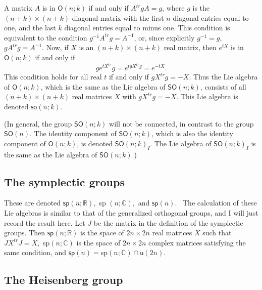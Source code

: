 \documentclass[12pt]{amsbook}
\theoremstyle{plain}
\numberwithin{equation}{chapter}
\numberwithin{theorem}{chapter}
\begin{document}
A matrix $A$ is in $\mathsf{O}(n;k)$ if and only if $A^{tr}gA=g$, where $g$ is
the $(n+k)\times(n+k)$ diagonal matrix with the first $n$ diagonal entries
equal to one, and the last $k$ diagonal entries equal to minus one. This
condition is equivalent to the condition $g^{-1}A^{tr}g=A^{-1}$, or, since
explicitly $g^{-1}=g$, $gA^{tr}g=A^{-1}$. Now, if $X$ is an $(n+k)\times(n+k)$
real matrix, then $e^{tX}$ is in $\mathsf{O}(n;k)$ if and only if
\[
ge^{tX^{tr}}g=e^{tgX^{tr}g}=e^{-tX}\text{.}%
\]
This condition holds for all real $t$ if and only if $gX^{tr}g=-X$. Thus the
Lie algebra of $\mathsf{O}(n;k)$, which is the same as the Lie algebra of
$\mathsf{SO}(n;k)$, consists of all $(n+k)\times(n+k)$ real matrices $X$ with
$gX^{tr}g=-X$. This Lie algebra is denoted $\mathsf{so}(n;k)$.

(In general, the group $\mathsf{SO}(n;k)$ will not be connected, in contrast
to the group $\mathsf{SO}(n)$. The identity component of $\mathsf{SO}(n;k)$,
which is also the identity component of $\mathsf{O}(n;k)$, is denoted
$\mathsf{SO}(n;k)_{I}$. The Lie algebra of $\mathsf{SO}(n;k)_{I}$ is the same
as the Lie algebra of $\mathsf{SO}(n;k)$.)

\subsection{The symplectic groups}

These are denoted $\mathsf{sp}\left(  n;\mathbb{R}\right)  ,$ \textsf{sp}%
$\left(  n;\mathbb{C}\right)  ,$ and $\mathsf{sp}\left(  n\right)  .$ \ The
calculation of these Lie algebras is similar to that of the generalized
orthogonal groups, and I will just record the result here. Let $J$ be the
matrix in the definition of the symplectic groups. Then $\mathsf{sp}\left(
n;\mathbb{R}\right)  $ is the space of $2n\times2n$ real matrices $X$ such
that $JX^{tr}J=X,$ \textsf{sp}$\left(  n;\mathbb{C}\right)  $ is the space of
$2n\times2n$ complex matrices satisfying the same condition, and
$\mathsf{sp}\left(  n\right)  =$\textsf{sp}$\left(  n;\mathbb{C}\right)
\cap\mathsf{u}\left(  2n\right)  .$

\subsection{The Heisenberg group}
\end{document}

